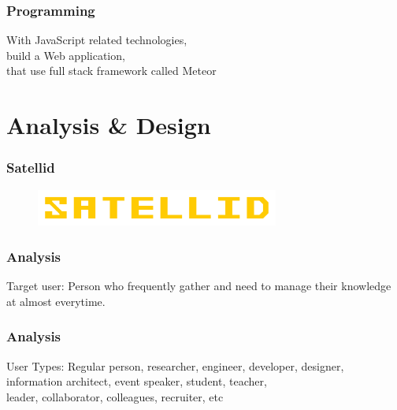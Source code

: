 \documentclass[10pt, compress]{beamer}
\begin{document}
\begin{frame}[fragile]
  \frametitle{Programming}

  With \alert{JavaScript} related technologies,\\
  build a Web application,\\
  that use full stack framework called \alert{Meteor}

\end{frame}


\section{Analysis \& Design}


\begin{frame}[fragile]
  \frametitle{Satellid}

  \begin{figure}[ht]
    \centering
    \includegraphics[width=8cm]{include/satellid-logo.png}
    \label{fig:satellid-logo}
  \end{figure}

\end{frame}


\begin{frame}[fragile]
  \frametitle{Analysis}

    \begin{block}{Target user:}
      Person who frequently gather and need to manage their knowledge at almost everytime.
    \end{block}

\end{frame}


\begin{frame}[fragile]
  \frametitle{Analysis}

    \begin{block}{User Types:}
      Regular person, researcher, engineer, developer, designer,\\
      information architect, event speaker, student, teacher,\\
      leader, collaborator, colleagues, recruiter, etc
    \end{block}

\end{frame}
\end{document}

